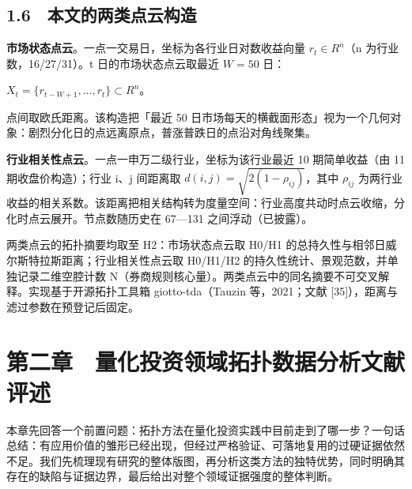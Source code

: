 \documentclass[12pt,a4paper]{ctexart}
\begin{document}
\subsection{1.6　本文的两类点云构造}
\textbf{市场状态点云}。一点一交易日，坐标为各行业日对数收益向量 \(r_t \in R^{n}\)（n 为行业数，16/27/31）。t 日的市场状态点云取最近 \(W = 50\) 日：\par
\(X_t = \{ r_{t-W+1}, \ldots, r_t \} \subset R^{n}\)。\par
点间取欧氏距离。该构造把「最近 50 日市场每天的横截面形态」视为一个几何对象：剧烈分化日的点远离原点，普涨普跌日的点沿对角线聚集。\par
\textbf{行业相关性点云}。一点一申万二级行业，坐标为该行业最近 10 期简单收益（由 11 期收盘价构造）；行业 i、j 间距离取 \(d(i,j) = \sqrt{2(1 - \rho_{ij})}\)，其中 \(\rho_{ij}\) 为两行业收益的相关系数。该距离把相关结构转为度量空间：行业高度共动时点云收缩，分化时点云展开。节点数随历史在 67—131 之间浮动（已披露）。\par
两类点云的拓扑摘要均取至 H2：市场状态点云取 H0/H1 的总持久性与相邻日威尔斯特拉斯距离；行业相关性点云取 H0/H1/H2 的持久性统计、景观范数，并单独记录二维空腔计数 N（券商规则核心量）。两类点云中的同名摘要不可交叉解释。实现基于开源拓扑工具箱 giotto-tda（Tauzin 等，2021；文献 [35]），距离与滤过参数在预登记后固定。\par
\section{第二章　量化投资领域拓扑数据分析文献评述}
本章先回答一个前置问题：拓扑方法在量化投资实践中目前走到了哪一步？一句话总结：有应用价值的雏形已经出现，但经过严格验证、可落地复用的过硬证据依然不足。我们先梳理现有研究的整体版图，再分析这类方法的独特优势，同时明确其存在的缺陷与证据边界，最后给出对整个领域证据强度的整体判断。\par
\end{document}
